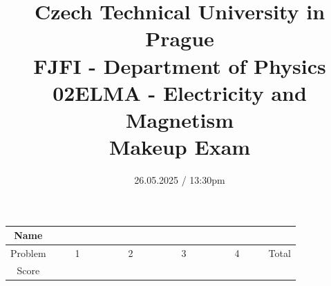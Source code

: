 \documentclass[a4paper,12pt]{article}
\title{{\large Czech Technical University in Prague} \\
    {\Large FJFI - Department of Physics} \\ 
                  02ELMA - Electricity and Magnetism \\ 
          {\Large \textbf{Makeup Exam}}\vspace{-1cm}}
\date{26.05.2025 / 13:30pm}
\author{}
\begin{document}
\maketitle
\vspace{-1.5em}

\begin{center}
    \renewcommand{\arraystretch}{2}
    \begin{tabular}{ |c|c|c|c|c|c| } 
        \hline
        Name& \multicolumn{5}{c|}{\phantom{~~~~~~~~~~~~~~~~~~~~~~~~~~~~~~~~~~~~~~~~~~~~~~~~~~~~~~~~~~~~~~~~~~~~~~~~~~~~~~~~~}}\\
        \hline
        Problem & ~~~~1~~~~ & ~~~~2~~~~ & ~~~~3~~~~ & ~~~~4~~~~ & Total \\ 
        \hline
        Score & &  & & & \\
        \hline
    \end{tabular}
\end{center}

\vspace*{1cm}







\end{document}

